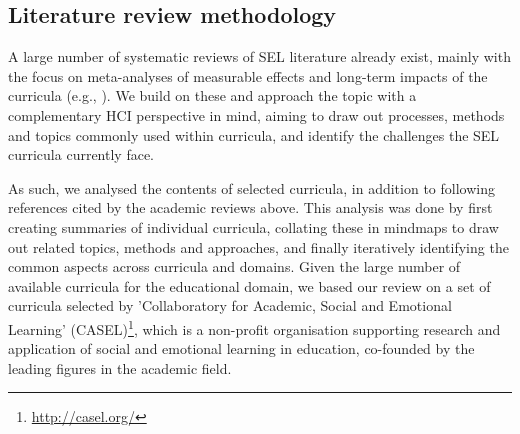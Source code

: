 \documentclass[prodmode,acmtochi]{acmsmall}
\newcommand{\todo}[1]{\textrm{\textrm{\textcolor{LightBlue}{[[#1]]} } } }
\newcommand{\rephrase}[1]{\textrm{\textrm{\textcolor{gray}{#1}}}}
\begin{document}
        \fi

        
\subsection{Literature review methodology}      
\label{sec:methodology}
A large number of systematic reviews of SEL literature already exist, mainly with the focus on meta-analyses of measurable effects and long-term impacts of the curricula (e.g., \cite{Durlak2011,Weare2011,Adi2007a,Greenberg2010,Elbertson2009,Payton2008}). 
%
We build on these and approach the topic with a complementary HCI perspective in mind, aiming to draw out processes, methods and topics commonly used within curricula, and identify the challenges the SEL curricula currently face. 

As such, we analysed the contents of selected curricula, in addition to following references cited by the academic reviews above. This analysis was done by first creating summaries of individual curricula, collating these in mindmaps to draw out related topics, methods and approaches, and finally iteratively identifying the common aspects across curricula and domains. 
%
Given the large number of available curricula for the educational domain, we based our review on a set of curricula selected by 'Collaboratory for Academic, Social and Emotional Learning' (CASEL)\footnote{\url{http://casel.org/}}, which is a non-profit organisation supporting research and application of social and emotional learning in education, co-founded by the leading figures in the academic field. 
\end{document}
